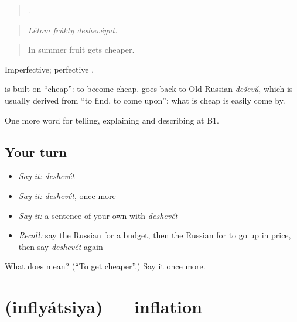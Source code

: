 \begin{quote}
  .
\end{quote}

\begin{quote}
\emph{Létom frúkty deshevéyut.}
\end{quote}

\begin{quote}
In summer fruit gets cheaper.
\end{quote}

Imperfective; perfective \emph{}.

\begin{cousinweb}
\textbf{} is built on \emph{} \textquotedblleft{}cheap\textquotedblright{}: to become cheap. \emph{} goes back to Old Russian \emph{deševŭ}, which is usually derived from \emph{} \textquotedblleft{}to find, to come upon\textquotedblright{}: what is cheap is easily come by.
\end{cousinweb}

\begin{grammarlens}[title={What you've built}]
One more word for telling, explaining and describing at B1.
\end{grammarlens}

\subsection*{Your turn}
\begin{itemize}
\raggedright
  \item \emph{Say it:} \emph{deshevét}
  \item \emph{Say it:} \emph{deshevét}, once more
  \item \emph{Say it:} a sentence of your own with \emph{deshevét}
  \item \emph{Recall:} say the Russian for a budget, then the Russian for to go up in price, then say \emph{deshevét} again
\end{itemize}

\begin{tcolorbox}[breakable,colback=teal!4,colframe=teal!35!black,title={Before you move on}]
What does  mean? (\textquotedblleft{}To get cheaper\textquotedblright{}.) Say it once more.
\end{tcolorbox}
\section[\texorpdfstring{\ru{инфляция} (inflyátsiya)}{инфляция (inflyátsiya)}]{ (inflyátsiya) — inflation}

